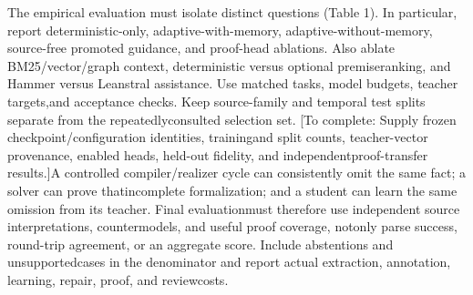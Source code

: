 
\noindent
The empirical evaluation must isolate distinct questions (Table 1). In particular, report deterministic-\linebreak[4]
only, adaptive-with-memory, adaptive-without-memory, source-free promoted guidance, and proof-\linebreak[4]
head ablations. Also ablate BM25/vector/graph context, deterministic versus optional premise\linebreak[4]
ranking, and Hammer versus Leanstral assistance. Use matched tasks, model budgets, teacher targets,\linebreak[4]
and acceptance checks. Keep source-family and temporal test splits separate from the repeatedly\linebreak[4]
consulted selection set. [To complete: Supply frozen checkpoint/configuration identities, training\linebreak[4]
and split counts, teacher-vector provenance, enabled heads, held-out fidelity, and independent\linebreak[4]
proof-transfer results.]\linebreak[4]
A controlled compiler/realizer cycle can consistently omit the same fact; a solver can prove that\linebreak[4]
incomplete formalization; and a student can learn the same omission from its teacher. Final evaluation\linebreak[4]
must therefore use independent source interpretations, countermodels, and useful proof coverage, not\linebreak[4]
only parse success, round-trip agreement, or an aggregate score. Include abstentions and unsupported\linebreak[4]
cases in the denominator and report actual extraction, annotation, learning, repair, proof, and review\linebreak[4]
costs.\par

